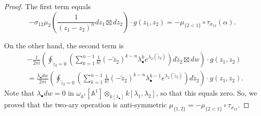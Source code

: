 \documentclass[11pt]{amsart}
\theoremstyle{definition}
\theoremstyle{remark}
\numberwithin{equation}{section}
\begin{document}
\begin{proof}
The first term equals
$$
-\sigma_{12}\mu_{2}(\frac{1}{(z_{1}-z_{2})^{n}}dz_{1}\boxtimes dz_{2})\cdot g(z_{1},z_{2})=-\mu_{\{2<1\}}
\circ\tau_{\sigma_{12}}(\alpha).
$$

On the other hand, the second term is
\begin{align*}
    &-\frac{1}{2\pi i}\left(\oint_{\tilde{z}_{2}=0}\left(\sum_{k=1}^{n-1}\frac{1}{k!}(-\tilde{z}_{2})^{k-n} \lambda_{\bullet}^{k}e^{\lambda_{2}(\tilde{z}_{2})}\right)d\tilde{z}_{2}\boxtimes dw\right)\cdot g(z_{1},z_{2})\\
     &=
     \frac{\lambda_{\bullet}dw}{2\pi i}\left(\oint_{\tilde{z}_{2}=0}\left(\sum_{k=1}^{n-1}\frac{1}{k!}(-\tilde{z}_{2})^{k-n} \lambda_{\bullet}^{k-1}e^{\lambda_{2}(\tilde{z}_{2})}\right)d\tilde{z}_{2}\right)\cdot g(z_{1},z_{2}).
\end{align*}
Note that $\lambda_{\bullet}dw=0$ in $\omega_{\mathbb{A}^{1}}[\mathbb{A}^{1}]\otimes_{k[\lambda_{\bullet}]}
k[\lambda_{1},\lambda_{2}]$, so that this equals zero. 
So, we proved that the two-ary operation is anti-symmetric $\mu_{\{1,2\}}=-\mu_{\{2<1\}}\circ \tau_{\sigma_{12}}.$


\end{proof}
\end{document}
